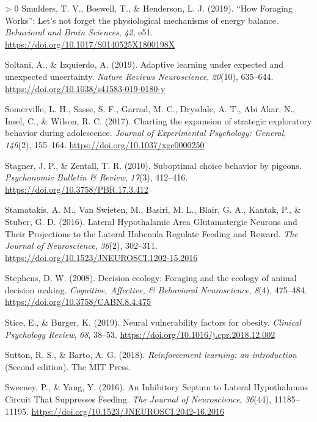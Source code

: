 \documentclass[
]{/home/nicoluarte/Downloads/templates/PNAS-template-main.tex}
\newlength{\cslhangindent}
\newenvironment{CSLReferences}[3] %
 {%
  \setlength{\parindent}{0pt}
  \ifodd #1 \everypar{\setlength{\hangindent}{\cslhangindent}}\ignorespaces\fi
  \ifnum #2 > 0
  \setlength{\parskip}{#2\baselineskip}
  \fi
 }%
 {}
\begin{document}
\begin{CSLReferences}{1}{0}
\leavevmode\hypertarget{ref-IATULRKH}{}%
Smulders, T. V., Boswell, T., \& Henderson, L. J. (2019). {``How
Foraging Works''}: Let's not forget the physiological mechanisms of
energy balance. \emph{Behavioral and Brain Sciences}, \emph{42}, e51.
\url{https://doi.org/10.1017/S0140525X1800198X}

\leavevmode\hypertarget{ref-P2FYNJKR}{}%
Soltani, A., \& Izquierdo, A. (2019). Adaptive learning under expected
and unexpected uncertainty. \emph{Nature Reviews Neuroscience},
\emph{20}(10), 635--644. \url{https://doi.org/10.1038/s41583-019-0180-y}

\leavevmode\hypertarget{ref-26M86HJZ}{}%
Somerville, L. H., Sasse, S. F., Garrad, M. C., Drysdale, A. T., Abi
Akar, N., Insel, C., \& Wilson, R. C. (2017). Charting the expansion of
strategic exploratory behavior during adolescence. \emph{Journal of
Experimental Psychology: General}, \emph{146}(2), 155--164.
\url{https://doi.org/10.1037/xge0000250}

\leavevmode\hypertarget{ref-YB2MIP4H}{}%
Stagner, J. P., \& Zentall, T. R. (2010). Suboptimal choice behavior by
pigeons. \emph{Psychonomic Bulletin \& Review}, \emph{17}(3), 412--416.
\url{https://doi.org/10.3758/PBR.17.3.412}

\leavevmode\hypertarget{ref-SZMQLQTN}{}%
Stamatakis, A. M., Van Swieten, M., Basiri, M. L., Blair, G. A., Kantak,
P., \& Stuber, G. D. (2016). Lateral Hypothalamic Area Glutamatergic
Neurons and Their Projections to the Lateral Habenula Regulate Feeding
and Reward. \emph{The Journal of Neuroscience}, \emph{36}(2), 302--311.
\url{https://doi.org/10.1523/JNEUROSCI.1202-15.2016}

\leavevmode\hypertarget{ref-P4NSHDMV}{}%
Stephens, D. W. (2008). Decision ecology: Foraging and the ecology of
animal decision making. \emph{Cognitive, Affective, \& Behavioral
Neuroscience}, \emph{8}(4), 475--484.
\url{https://doi.org/10.3758/CABN.8.4.475}

\leavevmode\hypertarget{ref-WCFW3TEU}{}%
Stice, E., \& Burger, K. (2019). Neural vulnerability factors for
obesity. \emph{Clinical Psychology Review}, \emph{68}, 38--53.
\url{https://doi.org/10.1016/j.cpr.2018.12.002}

\leavevmode\hypertarget{ref-2BEHEM7X}{}%
Sutton, R. S., \& Barto, A. G. (2018). \emph{Reinforcement learning: an
introduction} (Second edition). The MIT Press.

\leavevmode\hypertarget{ref-QWCCGZTT}{}%
Sweeney, P., \& Yang, Y. (2016). An Inhibitory Septum to Lateral
Hypothalamus Circuit That Suppresses Feeding. \emph{The Journal of
Neuroscience}, \emph{36}(44), 11185--11195.
\url{https://doi.org/10.1523/JNEUROSCI.2042-16.2016}


\end{CSLReferences}
\end{document}
